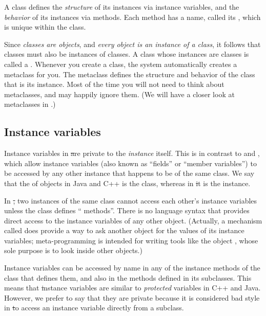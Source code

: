 \documentclass[a4paper,10pt,twoside]{book}
\begin{document}
A class defines the \emph{structure} of its instances via instance variables, and the \emph{behavior} of its instances via methods.
Each method has a name, called its , which is unique within the class.

Since \emph{classes are objects}, and \emph{every object is an instance of a class}, it follows that classes must also be instances of classes.
A class whose instances are classes is called a .
Whenever you create a class, the system automatically creates a metaclass for you.
The metaclass defines the structure and behavior of the class that is its instance.
Most of the time you will not need to think about metaclasses, and may happily ignore them.
(We will have a closer look at metaclasses in .)

\subsection{Instance variables}

Instance variables in \st are private to the \emph{instance} itself.
This is in contrast to  and , which allow instance variables (also known as ``fields'' or ``member variables'') to be accessed by any other instance that happens to be of the same class.
We say that the  of objects in Java and C++ is the class, whereas in \st it is the instance.

In \st, two instances of the same class cannot access each other's instance variables unless the class defines `` methods''.
There is no language syntax that provides direct access to the instance variables of any other object.
(Actually, a mechanism called 
does provide a way to ask another object for the values of its instance variables; meta-programming is intended for writing tools like the object , whose sole purpose is to look inside other objects.)

Instance variables can be accessed by name in any of the instance methods of the class that defines them, and also in the methods defined in its subclasses.
This means that \st instance variables are similar to \emph{protected} variables in C++ and Java.
However, we prefer to say that they are private because it is considered bad style in \st to access an instance variable directly from a subclass.
\end{document}
